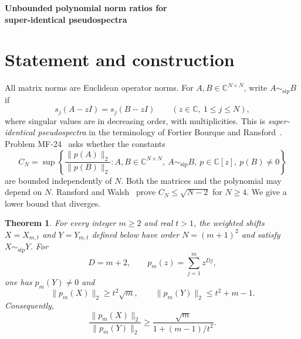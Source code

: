 \documentclass[11pt,a4paper]{article}
\newtheorem{theorem}{Theorem}
\newcommand{\norm}[1]{\lVert #1\rVert_2}
\newcommand{\sip}{\sim_{\mathrm{sip}}}
\begin{document}
\begin{center}
{\Large\bfseries Unbounded polynomial norm ratios for\\
super-identical pseudospectra}
\end{center}

\begin{abstract}
We give explicit nonnegative nilpotent weighted shifts of order $(m+1)^2$ whose singular
values agree after every complex scalar shift, but whose norms under a common
polynomial have ratio at least $(4/5)\sqrt m$. Thus no dimension-independent
comparison constant exists. A two-by-two transfer identity proves equality
of the shifted singular values; a residue-class decomposition gives the norm
bounds. The proof uses only finite matrices and elementary linear algebra.
It does not determine the optimal dimension-dependent bound.
\end{abstract}

\section{Statement and construction}
All matrix norms are Euclidean operator norms. For $A,B\in\mathbb C^{N\times N}$,
write $A\sip B$ if
\[
 s_j(A-zI)=s_j(B-zI)
 \qquad(z\in\mathbb C,\ 1\le j\le N),
\]
where singular values are in decreasing order, with multiplicities. This is
\emph{super-identical pseudospectra} in the terminology of
Fortier Bourque and Ransford~\cite{fortier-ransford}.
Problem MF-24~\cite{mf24} asks whether the constants
\begin{equation}\label{eq:CN}
 C_N=\sup\left\{
 \frac{\norm{p(A)}}{\norm{p(B)}}:
 A,B\in\mathbb C^{N\times N},\ A\sip B,\
 p\in\mathbb C[z],\ p(B)\ne0\right\}
\end{equation}
are bounded independently of $N$. Both the matrices and the polynomial
may depend on $N$. Ransford and Walsh~\cite[Theorem 1.3]{ransford-walsh}
prove $C_N\le\sqrt{N-2}$ for $N\ge4$. We give a lower bound that diverges.

\begin{theorem}\label{thm:main}
For every integer $m\ge2$ and real $t>1$, the weighted shifts $X=X_{m,t}$
and $Y=Y_{m,t}$ defined below have order $N=(m+1)^2$ and satisfy $X\sip Y$.
For
\begin{equation}\label{eq:p}
 D=m+2,\qquad p_m(z)=\sum_{j=1}^m z^{Dj},
\end{equation}
one has $p_m(Y)\ne0$ and
\begin{equation}\label{eq:bounds}
 \norm{p_m(X)}\ge t^2\sqrt m,\qquad
 \norm{p_m(Y)}\le t^2+m-1.
\end{equation}
Consequently,
\begin{equation}\label{eq:ratio}
 \frac{\norm{p_m(X)}}{\norm{p_m(Y)}}
 \ge \frac{\sqrt m}{1+(m-1)/t^2}.
\end{equation}
\end{theorem}
\end{document}
